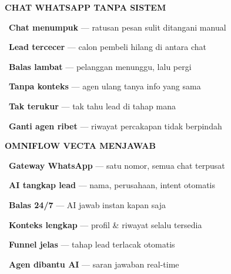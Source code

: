 \documentclass[a4paper]{article}
\begin{document}
\noindent
\begin{minipage}[t]{0.485\textwidth}
    \colorbox{RedLight}{%
        \begin{minipage}{\dimexpr\textwidth-2\fboxsep\relax}
            {\fontsize{10}{13}\selectfont\bfseries\color{RedText} CHAT WHATSAPP TANPA SISTEM}
        \end{minipage}}\par
    \vspace{4pt}

    {\fontsize{9.5}{13}\selectfont\color{TextDark}%
    \textbullet\ \textbf{Chat menumpuk} --- ratusan pesan sulit ditangani manual\par\vspace{4pt}%
    \textbullet\ \textbf{Lead tercecer} --- calon pembeli hilang di antara chat\par\vspace{4pt}%
    \textbullet\ \textbf{Balas lambat} --- pelanggan menunggu, lalu pergi\par\vspace{4pt}%
    \textbullet\ \textbf{Tanpa konteks} --- agen ulang tanya info yang sama\par\vspace{4pt}%
    \textbullet\ \textbf{Tak terukur} --- tak tahu lead di tahap mana\par\vspace{4pt}%
    \textbullet\ \textbf{Ganti agen ribet} --- riwayat percakapan tidak berpindah}%
\end{minipage}%
\hfill%
\begin{minipage}[t]{0.485\textwidth}
    \colorbox{BluePrimary}{%
        \begin{minipage}{\dimexpr\textwidth-2\fboxsep\relax}
            {\fontsize{10}{13}\selectfont\bfseries\color{White} OMNIFLOW VECTA MENJAWAB}
        \end{minipage}}\par
    \vspace{4pt}

    {\fontsize{9.5}{13}\selectfont\color{TextDark}%
    \textbullet\ \textbf{Gateway WhatsApp} --- satu nomor, semua chat terpusat\par\vspace{4pt}%
    \textbullet\ \textbf{AI tangkap lead} --- nama, perusahaan, intent otomatis\par\vspace{4pt}%
    \textbullet\ \textbf{Balas 24/7} --- AI jawab instan kapan saja\par\vspace{4pt}%
    \textbullet\ \textbf{Konteks lengkap} --- profil \& riwayat selalu tersedia\par\vspace{4pt}%
    \textbullet\ \textbf{Funnel jelas} --- tahap lead terlacak otomatis\par\vspace{4pt}%
    \textbullet\ \textbf{Agen dibantu AI} --- saran jawaban real-time}%
\end{minipage}
\end{document}
